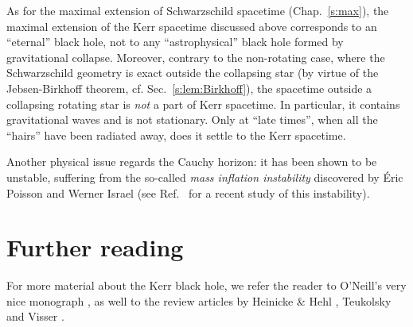 As for the maximal extension of Schwarzschild spacetime (Chap.~\ref{s:max}), the
maximal extension of the Kerr spacetime discussed above
corresponds to an ``eternal'' black hole, not to any ``astrophysical'' black hole
formed by gravitational
collapse. Moreover, contrary to the non-rotating case, where the Schwarzschild geometry
is exact outside the collapsing star (by virtue of the
Jebsen-Birkhoff theorem, cf. Sec.~\ref{s:lem:Birkhoff}), the spacetime outside
a collapsing rotating star is \emph{not} a part of Kerr spacetime. In particular, it contains gravitational waves and is not stationary. Only at ``late times'', when all the ``hairs'' have
been radiated away, does it settle to the Kerr spacetime.

Another physical issue regards the Cauchy horizon: it has been shown
to be unstable, suffering from the so-called
\emph{mass inflation instability}
discovered by Éric Poisson
and Werner Israel \cite{PoissI90}
(see Ref.~\cite{BurkoKZ16} for a recent study of this instability).

\section{Further reading}

For more material about the Kerr black hole, we refer
the reader to O'Neill's very nice monograph \cite{ONeil95},
as well to the review articles by
Heinicke \& Hehl \cite{HeiniH15}, Teukolsky \cite{Teuko15} and
Visser \cite{Visse09}.
